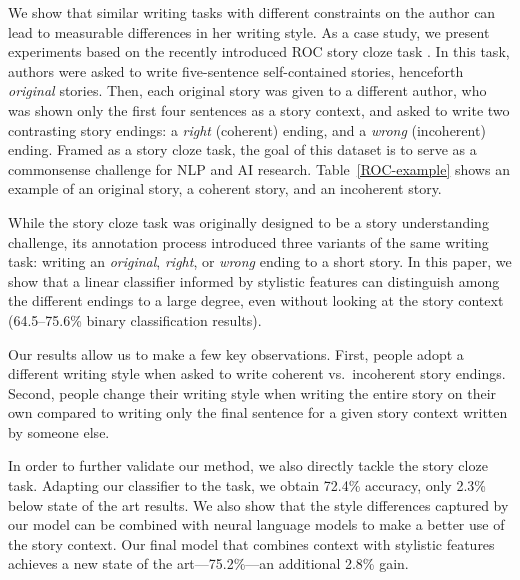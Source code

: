 \documentclass[11pt,a4paper]{article}
\newcommand{\tabref}[1]{Table~\ref{#1}}
\begin{document}
We show that similar writing tasks with different constraints on the
author can lead to measurable differences in her writing style.
As a case study, we present experiments   based on 
the recently introduced ROC story cloze task \cite{Mostafazadeh:2016}. 
In this task, authors were asked to write five-sentence self-contained stories, henceforth {\it original} stories.
Then, 
each original story was given to a different author, 
who was shown only the first four sentences as a story context, 
and asked to write two contrasting story endings: a {\it right} (coherent) ending, and a {\it wrong} (incoherent) ending. 
Framed as a story cloze task, the goal of this dataset is to serve as a commonsense challenge for NLP and AI research. 
\tabref{ROC-example} shows an example of an {original} story, a {coherent} story, and an {incoherent} story.



While the story cloze task was originally designed to be a story understanding challenge, 
its annotation process introduced three variants of the same writing task: writing an {\it original}, {\it right}, or {\it wrong} ending to a short story.
In this paper, we show that a linear classifier informed by stylistic features can distinguish among the different endings to a large degree, even without looking at the story context (64.5--75.6\% binary classification results).

Our results allow us to make a few key observations.
First, people adopt a different writing style when asked to write coherent vs.~incoherent story endings.
Second,  people change their writing style when writing the entire story on their own compared to 
writing only the final sentence for a given story context written by someone else.


In order to further validate our method, we also directly tackle the
story cloze task. 
Adapting our classifier to the task, we obtain 72.4\% accuracy, only 2.3\% below state of the art results.
We also show that the style differences captured by our model can be combined with neural language models to make a better use of the story context. 
Our final model that combines context with stylistic features achieves
a new state of the art---75.2\%---an additional 2.8\% gain.
\end{document}
